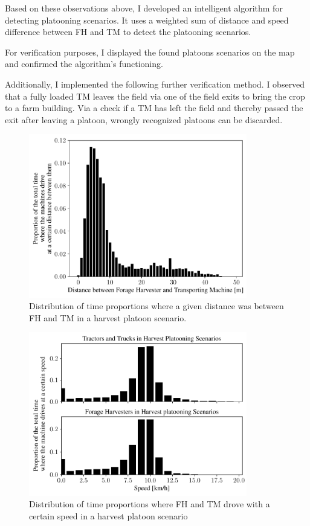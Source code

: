 \documentclass[]{nsm-thesis}
\begin{document}
Based on these observations above, I developed an intelligent algorithm for detecting platooning scenarios. It uses a weighted sum of distance and speed difference between \ac{FH} and \ac{TM} to detect the platooning scenarios.

For verification purposes, I displayed the found platoons scenarios on the map and confirmed the algorithm's functioning. 

Additionally, I implemented the following further verification method. 
I observed that a fully loaded \ac{TM} leaves the field via one of the field exits to bring the crop to a farm building. Via a
check if a \ac{TM} has left the field and thereby passed the exit after leaving a platoon,
wrongly recognized platoons can be discarded.

\begin{figure}%
	\centering
	\includegraphics[width=0.85\textwidth]{figures/distanceHarvestSzenario.pdf}
	\caption{Distribution of time proportions where a given distance was between \ac{FH} and \ac{TM} in a harvest platoon scenario.}%
	\label{fig:distance}%
\end{figure}
\begin{figure}%
	\centering
	\includegraphics[width=0.85\textwidth]{figures/speedHarvestSzenario.pdf}
	\caption{Distribution of time proportions where \ac{FH} and \ac{TM} drove with a certain speed in a harvest platoon scenario}%
	\label{fig:speed}%
\end{figure}
\end{document}
